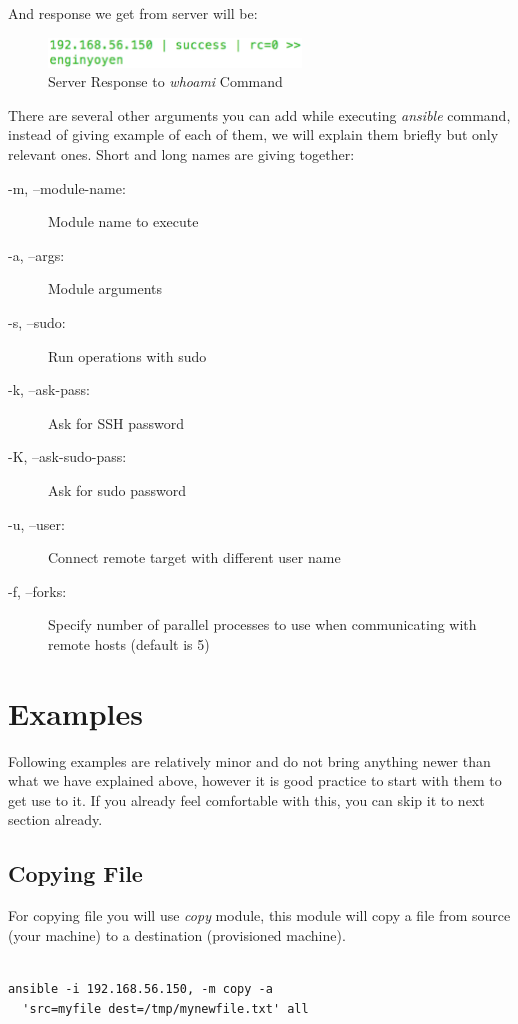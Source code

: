 \documentclass[10pt]{book}
\begin{document}
And response we get from server will be:


\begin{figure}[ht]
	\centering
  \includegraphics[width=0.6\textwidth]{figures/command-execution-whoami.eps}
	\caption{Server Response to \emph{whoami}  Command}
\end{figure}


There are several other arguments you can add while executing \emph{ansible}  
command, instead of giving example of each of them, we will explain them 
briefly but only relevant ones. Short and long names are giving together:

\begin{description}
\item[-m, --module-name:] Module name to execute
\item[-a, --args:]  Module arguments
\item[-s, --sudo:]  Run operations with sudo 
\item[-k, --ask-pass:] Ask for SSH password
\item[-K, --ask-sudo-pass:] Ask for sudo password
\item[-u, --user:] Connect remote target with different user name
\item[-f, --forks:]  Specify number of parallel processes to use when communicating with remote hosts 
(default is 5)

\end{description}

\section{Examples}
Following examples are relatively minor and do not bring anything newer than 
what we have explained above, however it is good practice to start with them to 
get use to it. If you already feel comfortable with this, you can skip it to 
next section already.

\subsection{Copying File}
For copying file you will use \emph{copy} module, this module will copy a file 
from source (your machine) to a destination (provisioned machine). 

\begin{Verbatim}

ansible -i 192.168.56.150, -m copy -a  
  'src=myfile dest=/tmp/mynewfile.txt' all
 
\end{Verbatim}
\end{document}
